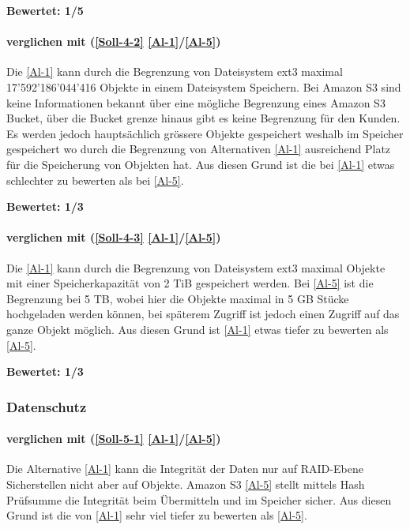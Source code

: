 \textbf{Bewertet: 1/5}

\paragraph*{  verglichen mit  (\ref{Soll-4-2} \ref{Al-1}/\ref{Al-5})} 
Die \ref{Al-1} kann durch die Begrenzung von Dateisystem ext3 maximal 17'592'186'044'416 Objekte in einem Dateisystem Speichern. Bei Amazon S3 sind keine Informationen bekannt über eine mögliche Begrenzung eines Amazon S3 Bucket, über die Bucket grenze hinaus gibt es keine Begrenzung für den Kunden. Es werden jedoch hauptsächlich grössere Objekte gespeichert weshalb im Speicher gespeichert wo durch die Begrenzung von Alternativen \ref{Al-1} ausreichend Platz für die Speicherung von Objekten hat. Aus diesen Grund ist die  bei \ref{Al-1} etwas schlechter zu bewerten als bei \ref{Al-5}.

\textbf{Bewertet: 1/3}

\paragraph*{  verglichen mit  (\ref{Soll-4-3} \ref{Al-1}/\ref{Al-5})} 
Die \ref{Al-1} kann durch die Begrenzung von Dateisystem ext3 maximal Objekte mit einer Speicherkapazität von 2 TiB gespeichert werden. Bei \ref{Al-5} ist die Begrenzung bei 5 TB, wobei hier die Objekte maximal in 5 GB Stücke hochgeladen werden können, bei späterem Zugriff ist jedoch einen Zugriff auf das ganze Objekt möglich. Aus diesen Grund ist \ref{Al-1} etwas tiefer zu bewerten als \ref{Al-5}.

\textbf{Bewertet: 1/3}

\subsubsection{Datenschutz}

\paragraph*{  verglichen mit  (\ref{Soll-5-1} \ref{Al-1}/\ref{Al-5})} 
Die Alternative \ref{Al-1} kann die Integrität der Daten nur auf RAID-Ebene Sicherstellen nicht aber auf Objekte. Amazon S3 \ref{Al-5} stellt mittels Hash Prüfsumme die Integrität beim Übermitteln und im Speicher sicher. Aus diesen Grund ist die  von \ref{Al-1} sehr viel tiefer zu bewerten als \ref{Al-5}.

